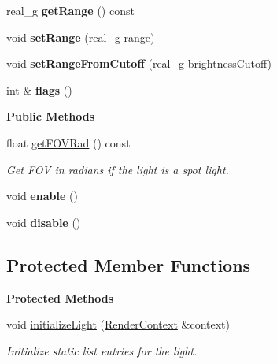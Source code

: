 \begin{Indent}
\begin{DoxyCompactItemize}
real\+\_\+g {\bfseries get\+Range} () const
\item 
\mbox{\label{classrev_1_1_light_a23fa083b76a70193723fa2310de51dbc}} 
void {\bfseries set\+Range} (real\+\_\+g range)
\item 
\mbox{\label{classrev_1_1_light_a3eabf7c7e64e6c8927a52c02f2d3a414}} 
void {\bfseries set\+Range\+From\+Cutoff} (real\+\_\+g brightness\+Cutoff)
\item 
\mbox{\label{classrev_1_1_light_a4dc8b606a50122a40c1b992a9c5ef09e}} 
int \& {\bfseries flags} ()
\end{DoxyCompactItemize}
\end{Indent}
\begin{Indent}\textbf{ Public Methods}\par
\begin{DoxyCompactItemize}
\item 
\mbox{\label{classrev_1_1_light_a600445b5c873316a741ac6390b4e5a51}} 
float \mbox{\hyperlink{classrev_1_1_light_a600445b5c873316a741ac6390b4e5a51}{get\+F\+O\+V\+Rad}} () const
\begin{DoxyCompactList}\small\item\em Get F\+OV in radians if the light is a spot light. \end{DoxyCompactList}\item 
\mbox{\label{classrev_1_1_light_a276aab0378cb3974ed88a05f0ce26502}} 
void {\bfseries enable} ()
\item 
\mbox{\label{classrev_1_1_light_acb4398ad4da62837343d90c6b51bf613}} 
void {\bfseries disable} ()
\end{DoxyCompactItemize}
\end{Indent}
\subsection*{Protected Member Functions}
\begin{Indent}\textbf{ Protected Methods}\par
\begin{DoxyCompactItemize}
\item 
\mbox{\label{classrev_1_1_light_aaf3f4ac86bc27f4d22962da3a0ee9d36}} 
void \mbox{\hyperlink{classrev_1_1_light_aaf3f4ac86bc27f4d22962da3a0ee9d36}{initialize\+Light}} (\mbox{\hyperlink{classrev_1_1_render_context}{Render\+Context}} \&context)
\begin{DoxyCompactList}\small\item\em Initialize static list entries for the light. \end{DoxyCompactList}\end{DoxyCompactItemize}
\end{Indent}
